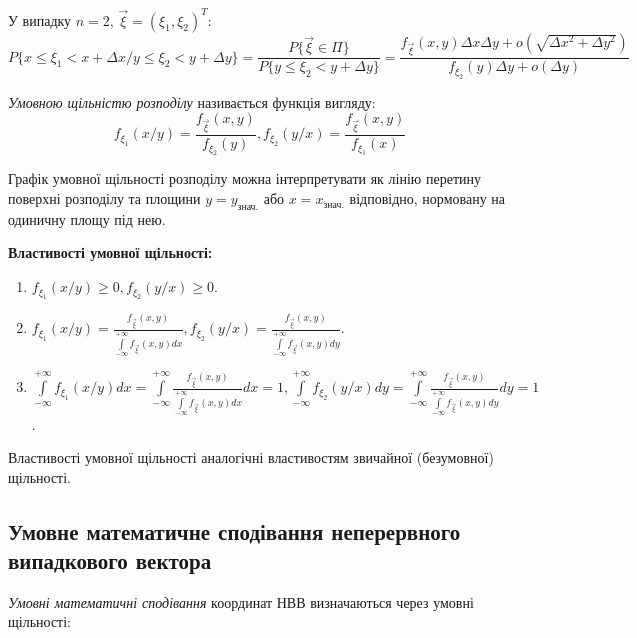 У випадку $n = 2$, $\vec{\xi} = (\xi_1, \xi_2)^T$: 
\begin{equation*}
    P\{x \leq \xi_1 < x + \Delta x / y \leq \xi_2 < y + \Delta y\} = 
    \frac{P\{\vec{\xi} \in \Pi\}}{P\{y \leq \xi_2 < y + \Delta y\}} = 
    \frac{f_{\vec{\xi}}(x,y)\Delta x \Delta y + 
    o(\sqrt{\Delta x^2 + \Delta y^2})}{f_{\xi_2}(y)\Delta y + o(\Delta y)}
\end{equation*}
\begin{definition}
    \emph{Умовною щільністю розподілу} називається функція 
    вигляду:
    \begin{equation*}
        f_{\xi_1}(x/y) = \frac{f_{\vec{\xi}}(x, y)}{f_{\xi_2}(y)}, f_{\xi_2}(y/x) = \frac{f_{\vec{\xi}}(x, y)}{f_{\xi_1}(x)}
    \end{equation*}
\end{definition}

\begin{remark}
    Графік умовної щільності розподілу можна інтерпретувати як лінію перетину 
    поверхні розподілу та площини $y = y_{\text{знач.}}$ або
    $x = x_{\text{знач.}}$ відповідно, нормовану на одиничну площу під нею.
\end{remark}

\noindent \textbf{Властивості умовної щільності:}
\begin{enumerate}
    \item $f_{\xi_1}(x / y) \geq 0, f_{\xi_2}(y / x) \geq 0$.
    \item $f_{\xi_1}(x/y) = \frac{f_{\vec{\xi}}(x,y)}
    {\int\limits_{-\infty}^{+\infty}f_{\vec{\xi}}(x,y)dx},
    f_{\xi_2}(y/x) = \frac{f_{\vec{\xi}}(x,y)}
    {\int\limits_{-\infty}^{+\infty}f_{\vec{\xi}}(x,y)dy}$.
    \item $\int\limits_{-\infty}^{+\infty} f_{\xi_1}(x / y) dx = 
    \int\limits_{-\infty}^{+\infty}\frac{f_{\vec{\xi}}(x,y)}
    {\int\limits_{-\infty}^{+\infty}f_{\vec{\xi}}(x,y)dx}dx = 1,
    \int\limits_{-\infty}^{+\infty} f_{\xi_2}(y / x) dy = 
    \int\limits_{-\infty}^{+\infty}\frac{f_{\vec{\xi}}(x,y)}
    {\int\limits_{-\infty}^{+\infty}f_{\vec{\xi}}(x,y)dy}dy = 1$.
\end{enumerate}
Властивості умовної щільності аналогічні властивостям звичайної (безумовної) щільності.

\subsection{Умовне математичне сподівання неперервного випадкового вектора}
\emph{Умовні математичні сподівання} координат НВВ визначаються через умовні щільності:

